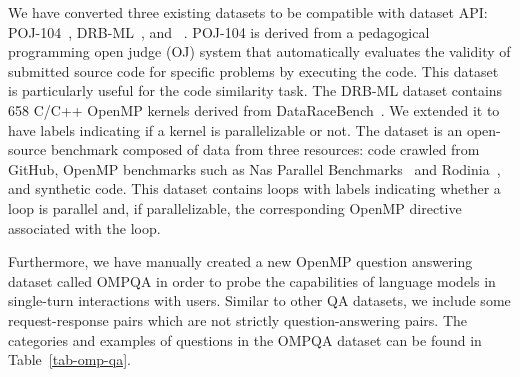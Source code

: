 We have converted three existing datasets to be compatible with \face dataset API: POJ-104~\cite{dataset:poj104}, DRB-ML~\cite{osti_1958879}, and \crawldata~\cite{chen2023learning-dataset}.  
POJ-104 is derived from a pedagogical programming open judge (OJ) system that automatically evaluates the validity of submitted source code for specific problems by executing the code. This dataset is particularly useful for the code similarity task. %
The DRB-ML dataset contains 658 C/C++ OpenMP kernels derived from DataRaceBench~\cite{dataset:dataracebench}. We extended it to have labels indicating if a kernel is parallelizable or not. 
The \crawldata dataset is an open-source benchmark composed of data from three resources: code crawled from GitHub, OpenMP benchmarks such as Nas Parallel Benchmarks~\cite{jin1999openmp} and Rodinia~\cite{che2009rodinia}, and synthetic code. This dataset contains loops with labels indicating whether a loop is parallel and, if parallelizable, the corresponding OpenMP directive associated with the loop. 

Furthermore, we have manually created a new OpenMP question answering dataset called OMPQA in order to probe the capabilities of language models in single-turn interactions with users. Similar to other QA datasets, we include some request-response pairs which are not strictly question-answering pairs. 
The categories and examples of questions in the OMPQA dataset can be found in  Table~\ref{tab-omp-qa}. 



